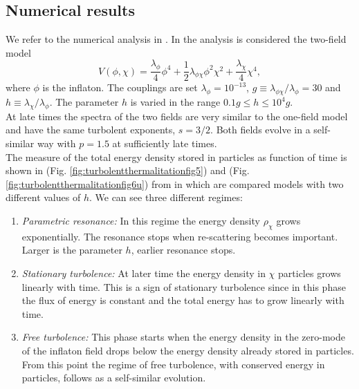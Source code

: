 \documentclass[11pt,a4paper,twoside]{book}
\begin{document}
\subsection{Numerical results}
We refer to the numerical analysis in \cite{Chap6:TurbolentThermalitation}. In the analysis is considered the two-field model 
\begin{equation}
\label{Chap6:twoFieldModel}
 V(\phi,\chi)=\frac{\lambda_{\phi}}{4}\phi^{4} + \frac{1}{2}\lambda_{\phi \chi}\phi^{2}\chi^{2} + \frac{\lambda_{\chi}}{4}\chi^{4},
\end{equation}
where $\phi$ is the inflaton. The couplings are set $ \lambda_{\phi}=10^{-13} $, $ g \equiv  \lambda_{\phi \chi}/\lambda_{\phi}=30 $ and $ h \equiv \lambda_{\chi}/\lambda_{\phi} $. The parameter $ h $ is varied in the range $ 0.1 g \le h \le 10^{4} g $.\\
At late times the spectra of the two fields are very similar to the one-field model and have the same turbolent exponents, $ s=3/2 $. Both fields evolve in a self-similar way with $ p=1.5 $ at sufficiently late times.\\
The measure of the total energy density stored in particles as function of time is shown in (Fig. \ref{fig:turbolentthermalitationfig5}) and (Fig. \ref{fig:turbolentthermalitationfig6u}) from \cite{Chap6:TurbolentThermalitation} in which are compared models with two different values of $ h $. We can see three different regimes:
\begin{enumerate}
	\item \textit{Parametric resonance:} In this regime the energy density $\rho_{\chi}$ grows exponentially. The resonance stops when re-scattering becomes important. Larger is the parameter $ h $, earlier resonance stops.
	
	\item \textit{Stationary turbolence:} At later time the energy density in $\chi$ particles grows linearly with time. This is a sign of stationary turbolence since in this phase the flux of energy is constant and the total energy has to grow linearly with time.
	
	\item \textit{Free turbolence:} This phase starts when the energy density in the zero-mode of the inflaton field drops below  the energy density already stored in particles. From this point the regime of free turbolence, with conserved energy in particles, follows as a self-similar evolution.
\end{enumerate}
\end{document}
